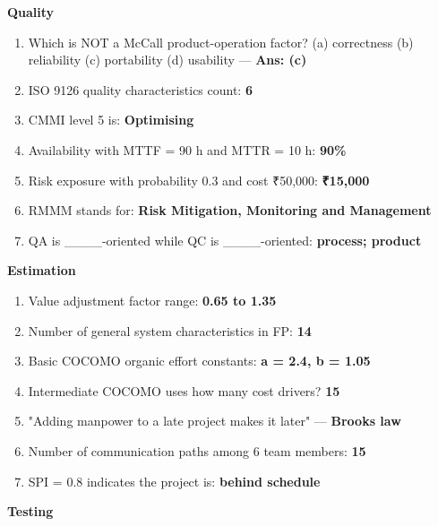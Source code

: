 \textbf{Quality}

\begin{enumerate}
\def\labelenumi{\arabic{enumi}.}
\setcounter{enumi}{21}
\tightlist
\item
  Which is NOT a McCall product-operation factor? (a) correctness (b) reliability (c) portability (d) usability --- \textbf{Ans: (c)}
\item
  ISO 9126 quality characteristics count: \textbf{6}
\item
  CMMI level 5 is: \textbf{Optimising}
\item
  Availability with MTTF = 90 h and MTTR = 10 h: \textbf{90\%}
\item
  Risk exposure with probability 0.3 and cost ₹50,000: \textbf{₹15,000}
\item
  RMMM stands for: \textbf{Risk Mitigation, Monitoring and Management}
\item
  QA is \_\_\_\_-oriented while QC is \_\_\_\_-oriented: \textbf{process; product}
\end{enumerate}

\textbf{Estimation}

\begin{enumerate}
\def\labelenumi{\arabic{enumi}.}
\setcounter{enumi}{28}
\tightlist
\item
  Value adjustment factor range: \textbf{0.65 to 1.35}
\item
  Number of general system characteristics in FP: \textbf{14}
\item
  Basic COCOMO organic effort constants: \textbf{a = 2.4, b = 1.05}
\item
  Intermediate COCOMO uses how many cost drivers? \textbf{15}
\item
  "Adding manpower to a late project makes it later" --- \textbf{Brooks\textquotesingle{} law}
\item
  Number of communication paths among 6 team members: \textbf{15}
\item
  SPI = 0.8 indicates the project is: \textbf{behind schedule}
\end{enumerate}

\textbf{Testing}


